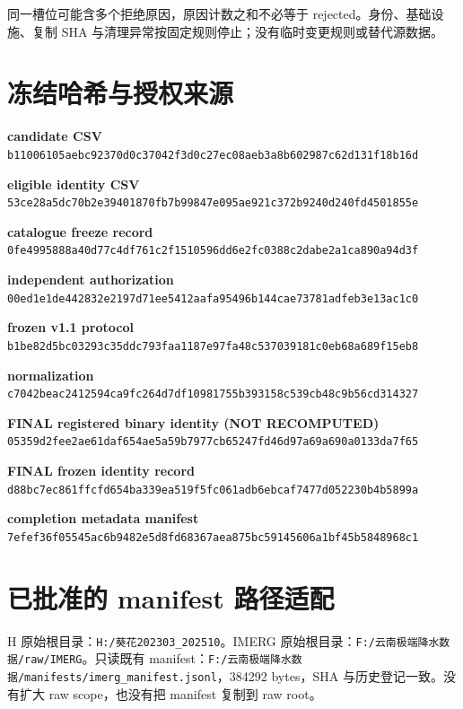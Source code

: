 \documentclass[UTF8,11pt,a4paper,fontset=windows]{ctexart}
\begin{document}
同一槽位可能含多个拒绝原因，原因计数之和不必等于 rejected。身份、基础设施、复制 SHA 与清理异常按固定规则停止；没有临时变更规则或替代源数据。
\newpage
\section*{冻结哈希与授权来源}
\textbf{candidate CSV}\\{\footnotesize\texttt{b11006105aebc92370d0c37042f3d0c27ec08aeb3a8b602987c62d131f18b16d}}\par
\textbf{eligible identity CSV}\\{\footnotesize\texttt{53ce28a5dc70b2e39401870fb7b99847e095ae921c372b9240d240fd4501855e}}\par
\textbf{catalogue freeze record}\\{\footnotesize\texttt{0fe4995888a40d77c4df761c2f1510596dd6e2fc0388c2dabe2a1ca890a94d3f}}\par
\textbf{independent authorization}\\{\footnotesize\texttt{00ed1e1de442832e2197d71ee5412aafa95496b144cae73781adfeb3e13ac1c0}}\par
\textbf{frozen v1.1 protocol}\\{\footnotesize\texttt{b1be82d5bc03293c35ddc793faa1187e97fa48c537039181c0eb68a689f15eb8}}\par
\textbf{normalization}\\{\footnotesize\texttt{c7042beac2412594ca9fc264d7df10981755b393158c539cb48c9b56cd314327}}\par
\textbf{FINAL registered binary identity (NOT RECOMPUTED)}\\{\footnotesize\texttt{05359d2fee2ae61daf654ae5a59b7977cb65247fd46d97a69a690a0133da7f65}}\par
\textbf{FINAL frozen identity record}\\{\footnotesize\texttt{d88bc7ec861ffcfd654ba339ea519f5fc061adb6ebcaf7477d052230b4b5899a}}\par
\textbf{completion metadata manifest}\\{\footnotesize\texttt{7efef36f05545ac6b9482e5d8fd68367aea875bc59145606a1bf45b5848968c1}}\par
\section*{已批准的 manifest 路径适配}
H 原始根目录：\texttt{H:/葵花202303\_202510}。IMERG 原始根目录：\texttt{F:/云南极端降水数据/raw/IMERG}。只读既有 manifest：\texttt{F:/云南极端降水数据/manifests/imerg\_manifest.jsonl}，384292 bytes，SHA 与历史登记一致。没有扩大 raw scope，也没有把 manifest 复制到 raw root。
\end{document}
